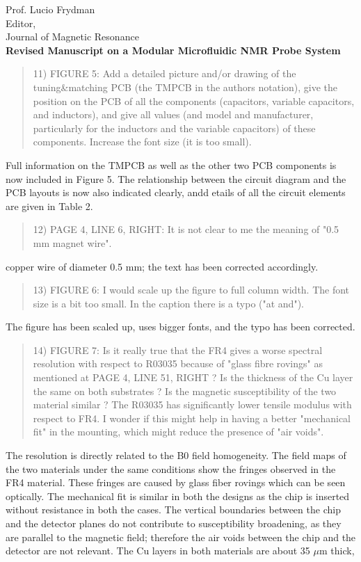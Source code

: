 \documentclass{mu-soton-letter}
\newenvironment{reviewer} {\begin{quote}\color{black!50}} {\end{quote}}
\begin{document}
\begin{letter}{Prof. Lucio Frydman\\
  Editor,\\
  Journal of Magnetic Resonance\\[2cm]
  \textbf{Revised Manuscript on a Modular Microfluidic NMR Probe System}}
\begin{reviewer}
11) FIGURE 5: Add a detailed picture and/or drawing of the tuning\&matching PCB (the TMPCB in the authors notation), give the position on the PCB of all the components (capacitors, variable capacitors, and inductors), and give all values (and model and manufacturer, particularly for the inductors and the variable capacitors) of these components. Increase the font size (it is too small).
\end{reviewer}
Full information on the TMPCB as well as the other two PCB components is now
included in Figure 5. The relationship between the circuit diagram and the PCB
layouts is now also indicated clearly, andd etails of all the circuit
elements are given in Table 2.
\begin{reviewer}
12) PAGE 4, LINE 6, RIGHT: It is not clear to me the meaning of "0.5 mm magnet wire".
\end{reviewer}
copper wire of diameter 0.5 mm; the text has been corrected accordingly.
\begin{reviewer}
13) FIGURE 6: I would scale up the figure to full column width. The font size is a bit too small. In the caption there is a typo ("at and").
\end{reviewer}
The figure has been scaled up, uses bigger fonts, and the typo has been corrected.
\begin{reviewer}
14) FIGURE 7: Is it really true that the FR4 gives a worse spectral resolution with respect to R03035 because of "glass fibre rovings" as mentioned at PAGE 4, LINE 51, RIGHT ? Is the thickness of the Cu layer the same on both substrates ? Is the magnetic susceptibility of the two material similar ? The R03035 has significantly lower tensile modulus with respect to FR4. I wonder if this might help in having a better "mechanical fit" in the mounting, which might reduce the presence of "air voids".
\end{reviewer}
The resolution is directly related to the B0 field homogeneity.
The field maps of the two materials under the same conditions show the fringes
observed in the FR4 material. These fringes are caused by glass fiber
rovings which can be seen optically.
The mechanical fit is similar in both the designs as the chip is inserted
without resistance in both the cases. The vertical boundaries between the chip and the
detector planes do not contribute to susceptibility broadening, as they are parallel
to the magnetic field; therefore the air voids between the chip and the detector
are not relevant. The Cu layers in both materials are about 35 $\mu$m thick,

\end{letter}
\end{document}
